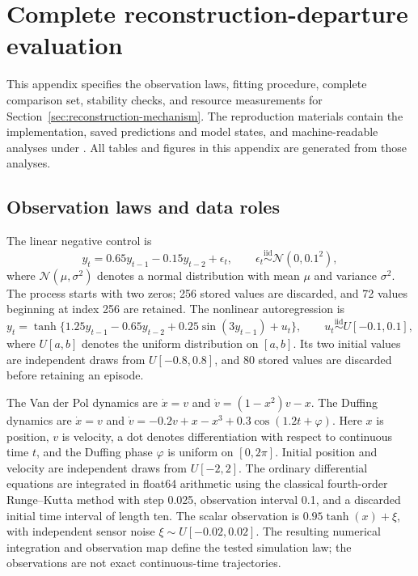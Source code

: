 \section{Complete reconstruction-departure evaluation}
\label{app:reconstruction-results}

This appendix specifies the observation laws, fitting procedure, complete
comparison set, stability checks, and resource measurements for
Section~\ref{sec:reconstruction-mechanism}. The reproduction materials
contain the implementation, saved predictions and model states, and
machine-readable analyses under
. All tables and figures in
this appendix are generated from those analyses.

\subsection{Observation laws and data roles}

The linear negative control is
\[
 y_t=0.65y_{t-1}-0.15y_{t-2}+\epsilon_t,
 \qquad \epsilon_t\stackrel{\mathrm{iid}}\sim\mathcal N(0,0.1^2),
\]
where $\mathcal N(\mu,\sigma^2)$ denotes a normal distribution with
mean $\mu$ and variance $\sigma^2$. The process starts with two zeros;
256 stored values are discarded, and 72 values beginning at index 256
are retained. The nonlinear autoregression is
\[
 y_t=\tanh\{1.25y_{t-1}-0.65y_{t-2}
             +0.25\sin(3y_{t-1})+u_t\},
 \qquad u_t\stackrel{\mathrm{iid}}\sim U[-0.1,0.1],
\]
where $U[a,b]$ denotes the uniform distribution on $[a,b]$. Its two
initial values are independent draws from $U[-0.8,0.8]$, and 80 stored
values are discarded before retaining an episode.

The Van der Pol dynamics are $\dot x=v$ and
$\dot v=(1-x^2)v-x$. The Duffing dynamics are $\dot x=v$ and
$\dot v=-0.2v+x-x^3+0.3\cos(1.2t+\varphi)$. Here $x$ is position,
$v$ is velocity, a dot denotes differentiation with respect to continuous
time $t$, and the Duffing phase $\varphi$ is uniform on $[0,2\pi]$.
Initial position and velocity are independent draws from $U[-2,2]$.
The ordinary differential equations are integrated in float64 arithmetic
using the classical fourth-order Runge--Kutta method with step 0.025,
observation interval 0.1, and a discarded initial time interval of length
ten. The scalar observation is $0.95\tanh(x)+\xi$, with independent
sensor noise $\xi\sim U[-0.02,0.02]$. The resulting numerical
integration and observation map define the tested simulation law; the
observations are not exact continuous-time trajectories.

